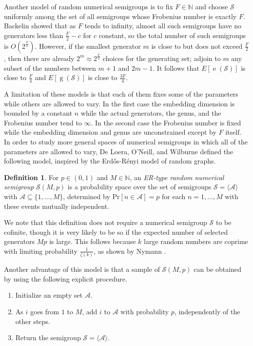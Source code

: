 \documentclass[11pt]{amsart}
\theoremstyle{definition}
\newtheorem{definition}[theorem]{Definition}
\theoremstyle{remark}
\def\NN{\ensuremath{\mathbb{N}}}
\def\cA{\ensuremath{\mathcal{A}}}
\def\Pr{\ensuremath{\mathrm{Pr}}}
\def\nsg{\ensuremath{\mathcal{S}}}
\DeclareMathOperator\g{g}
\DeclareMathOperator\e{e}
\begin{document}
Another model of random numerical semigroups is to fix $F \in \NN$ and choose $\nsg$ uniformly among the set of all semigroups whose Frobenius number is exactly $F$. Backelin \cite{Back} showed that as $F$ tends to infinity, almost all such semigroups have no generators less than $\frac{F}{2}-c$ for $c$ constant, so the total number of such semigroups is $O\left(2^{\frac{F}{2}}\right)$. However, if the smallest generator $m$ is close to but does not exceed $\frac{F}{2}$, then there are already $2^m \approx 2^{\frac{F}{2}}$ choices for the generating set; adjoin to $m$ any subset of the numbers between $m+1$ and $2m-1$. It follows that $E[\e(\nsg)]$ is close to $\frac{F}{4}$ and $E[\g(\nsg)]$ is close to $\frac{3F}{4}$. 

A limitation of these models is that each of them fixes some of the parameters while others are allowed to vary. In the first case the embedding dimension is bounded by a constant $n$ while the actual generators, the genus, and the Frobenius number tend to $\infty$. In the second case the Frobenius number is fixed while the embedding dimension and genus are unconstrained except by $F$ itself. In order to study more general spaces of numerical semigroups in which all of the parameters are allowed to vary, De Loera, O'Neill, and Wilburne \cite{de2018random} defined the following model, inspired by the Erd\H{o}s-R\'enyi model of random graphs.

\begin{definition}\label{def:ermodel}
    For $p \in (0, 1)$ and $M \in \NN$, an \emph{ER-type random numerical semigroup} $\nsg(M, p)$ is a probability space over the set of semigroups $\nsg = \langle\cA\rangle$ with $\cA \subseteq \{1,...,M\}$, determined by $\Pr[n \in \cA] = p$ for each $n = 1,\dots, M$ with these events mutually independent.
\end{definition}
We note that this definition does not require a numerical semigroup $\nsg$ to be cofinite, though it is very likely to be so if the expected number of selected generators $Mp$ is large. This follows because $k$ large random numbers are coprime with limiting probability $\frac{1}{\zeta(k)}$, as shown by Nymann \cite{Nymann}.

Another advantage of this model is that a sample of $\nsg(M, p)$ can be obtained by using the following explicit procedure.
\begin{enumerate}
    \item Initialize an empty set $\cA$.
    \item As $i$ goes from $1$ to $M$, add $i$ to $\cA$ with probability $p$, independently of the other steps.
    \item Return the semigroup $\nsg = \langle\cA\rangle$.
\end{enumerate}
\end{document}
